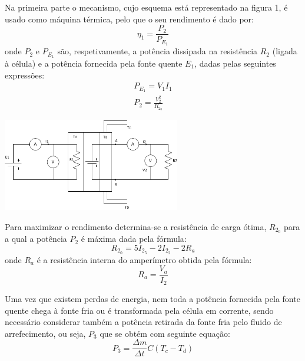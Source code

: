\documentclass[10pt]{extarticle}
\begin{document}
\begin{multicols}{2}
Na primeira parte o mecanismo, cujo esquema está representado na figura 1, é usado como máquina térmica, pelo que o seu rendimento é dado por:
\begin{equation}
\eta_1=\frac{P_2}{P_{E_{1}}}
\end{equation}
onde $P_2$ e $P_{E_{1}}$ são, respetivamente, a potência dissipada na resistência $R_2$ (ligada à célula) e a potência fornecida pela fonte quente $E_1$, dadas pelas seguintes expressões:
\begin{gather}
P_{E_{1}} = V_1 I_1 \\
P_2 = \frac{{V_2^2}}{R_{2_{0}}}
\end{gather}

\hspace{-0.8cm}
\begin{center}
\includegraphics[width=220pt]{figura1.png}
\begin{center}
\par{}
\end{center}
\end{center}

Para maximizar o rendimento determina-se a resistência de carga ótima, $R_{2{_0}}$ para a qual a potência $P_2$ é máxima dada pela fórmula:
\begin{equation}
R_{2{_0}} = 5I_{2{_5}} - 2I_{2{_2}} - 2 R_a
\end{equation}
onde $R_a$ é a resistência interna do amperímetro obtida pela fórmula:
\begin{equation}
R_a = \frac{V_a}{I_2} 
\end{equation}

Uma vez que existem perdas de energia, nem toda a potência fornecida pela fonte quente chega à fonte fria ou é transformada pela célula em corrente, sendo necessário considerar também a potência retirada da fonte fria pelo fluido de arrefecimento, ou seja, $ P_3$ que se obtém com seguinte equação:
\begin{equation}
P_3 = \frac{\Delta m}{\Delta t} C (T_c-T_d)
\end{equation}


\end{multicols}
\end{document}
